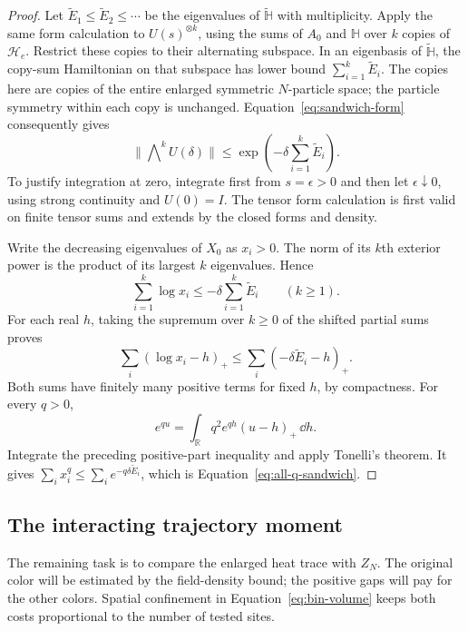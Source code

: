 \begin{proof}
Let $\widetilde E_1\le\widetilde E_2\le\cdots$
be the eigenvalues of $\widetilde{\mathbb H}$ with
multiplicity.  Apply the same form calculation to
$U(s)^{\otimes k}$, using the sums of $A_0$ and
$\mathbb H$ over $k$ copies of $\mathcal H_e$.
Restrict these copies to their alternating subspace.
In an eigenbasis of $\widetilde{\mathbb H}$, the
copy-sum Hamiltonian on that subspace has lower bound
$\sum_{i=1}^k\widetilde E_i$.  The copies here are
copies of the entire enlarged symmetric $N$-particle
space; the particle symmetry within each copy is
unchanged.  Equation~\eqref{eq:sandwich-form} consequently
gives
\[
 \|\mathop{\bigwedge}\nolimits^k U(\delta)\|
 \le\exp\left(-\delta\sum_{i=1}^k\widetilde E_i\right).
\]
To justify integration at zero, integrate first from
$s=\epsilon>0$ and then let $\epsilon\downarrow0$,
using strong continuity and $U(0)=I$.  The tensor
form calculation is first valid on finite tensor
sums and extends by the closed forms and density.

Write the decreasing eigenvalues of $X_0$ as $x_i>0$.
The norm of its $k$th exterior power is the product of
its largest $k$ eigenvalues.  Hence
\[
 \sum_{i=1}^k\log x_i
 \le-\delta\sum_{i=1}^k\widetilde E_i
 \qquad(k\ge1).
\]
For each real $h$, taking the supremum over $k\ge0$
of the shifted partial sums proves
\[
 \sum_i(\log x_i-h)_+
 \le\sum_i(-\delta\widetilde E_i-h)_+.
\]
Both sums have finitely many positive terms for fixed
$h$, by compactness.  For every $q>0$,
\[
 e^{qu}=\int_{\mathbb R}q^2e^{qh}(u-h)_+\,\dd h.
\]
Integrate the preceding positive-part inequality and
apply Tonelli's theorem.  It gives
$\sum_i x_i^q\le\sum_i e^{-q\delta\widetilde E_i}$,
which is Equation~\eqref{eq:all-q-sandwich}.
\end{proof}

\subsection{The interacting trajectory moment}

The remaining task is to compare the enlarged heat trace
with $Z_N$.  The original color will be estimated by the
field-density bound; the positive gaps will pay for the
other colors.  Spatial confinement in
Equation~\eqref{eq:bin-volume} keeps both costs
proportional to the number of tested sites.

